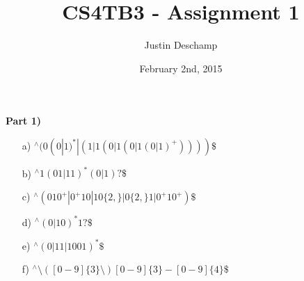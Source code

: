 \documentclass[12pt]{article}
\title{CS4TB3 - Assignment 1}
\author{Justin Deschamp}
\date{February 2nd, 2015}
\begin{document}
\maketitle

\textbf{Part 1)}
\begin{itemize}

\item[a)] $^\wedge(0(0|1)^*|(1|1(0|1(0|1(0|1)^+))))\$$

\item[b)] $^\wedge1(01|11)^*(0|1)?\$$

\item[c)] $^\wedge(010^+|0^+10|10\{2,\}|0\{2,\}1|0^+10^+)\$$

\item[d)] $^\wedge(0|10)^*1?\$$

\item[e)] $^\wedge(0|11|1001)^*\$$

\item[f)] $^\wedge\setminus([0-9]\{3\}\setminus)[0-9]\{3\}-[0-9]\{4\}\$$

\end{itemize}
\end{document}
